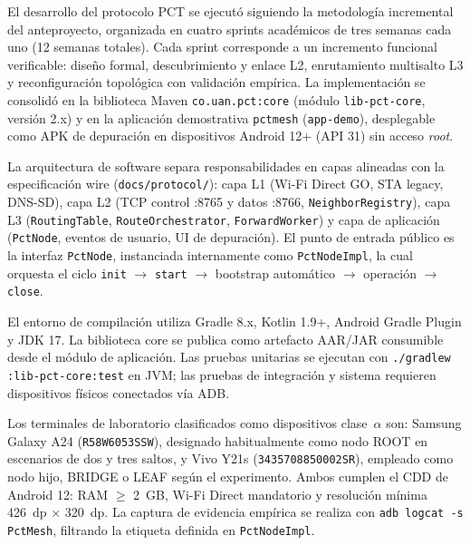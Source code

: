

El desarrollo del protocolo PCT se ejecutó siguiendo la metodología incremental del anteproyecto, organizada en cuatro sprints académicos de tres semanas cada uno (12 semanas totales). Cada sprint corresponde a un incremento funcional verificable: diseño formal, descubrimiento y enlace L2, enrutamiento multisalto L3 y reconfiguración topológica con validación empírica. La implementación se consolidó en la biblioteca Maven \texttt{co.uan.pct:core} (módulo \texttt{lib-pct-core}, versión 2.x) y en la aplicación demostrativa \texttt{pctmesh} (\texttt{app-demo}), desplegable como APK de depuración en dispositivos Android 12+ (API 31) sin acceso \emph{root}.

La arquitectura de software separa responsabilidades en capas alineadas con la especificación wire (\texttt{docs/protocol/}): capa L1 (Wi-Fi Direct GO, STA legacy, DNS-SD), capa L2 (TCP control :8765 y datos :8766, \texttt{NeighborRegistry}), capa L3 (\texttt{RoutingTable}, \texttt{RouteOrchestrator}, \texttt{ForwardWorker}) y capa de aplicación (\texttt{PctNode}, eventos de usuario, UI de depuración). El punto de entrada público es la interfaz \texttt{PctNode}, instanciada internamente como \texttt{PctNodeImpl}, la cual orquesta el ciclo \texttt{init} $\rightarrow$ \texttt{start} $\rightarrow$ bootstrap automático $\rightarrow$ operación $\rightarrow$ \texttt{close}.


El entorno de compilación utiliza Gradle 8.x, Kotlin 1.9+, Android Gradle Plugin y JDK 17. La biblioteca core se publica como artefacto AAR/JAR consumible desde el módulo de aplicación. Las pruebas unitarias se ejecutan con \texttt{./gradlew :lib-pct-core:test} en JVM; las pruebas de integración y sistema requieren dispositivos físicos conectados vía ADB.

Los terminales de laboratorio clasificados como dispositivos clase~$\alpha$ son: Samsung Galaxy A24 (\texttt{R58W6053SSW}), designado habitualmente como nodo ROOT en escenarios de dos y tres saltos, y Vivo Y21s (\texttt{3435708850002SR}), empleado como nodo hijo, BRIDGE o LEAF según el experimento. Ambos cumplen el CDD de Android 12: RAM $\geq$ 2~GB, Wi-Fi Direct mandatorio y resolución mínima 426~dp $\times$ 320~dp. La captura de evidencia empírica se realiza con \texttt{adb logcat -s PctMesh}, filtrando la etiqueta definida en \texttt{PctNodeImpl}.

